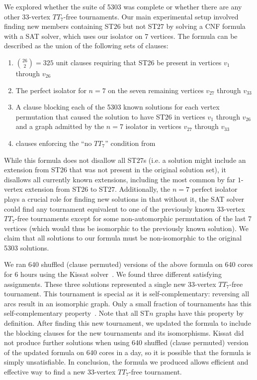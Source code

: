 \documentclass[conference]{IEEEtran}
\begin{document}
We explored whether the suite of 5303 was complete or whether there are any other 33-vertex $TT_7$-free tournaments.
 Our main experimental setup involved finding new members containing ST$26$ but not ST$27$ by solving a CNF formula with a SAT solver, which uses our isolator on 7 vertices. The formula can be described as the union of the following sets of clauses:
 
 \begin{enumerate}
 \item ${26 \choose 2} = 325$ unit clauses requiring that ST26 be present in vertices $v_1$ through $v_{26}$
 \item The perfect isolator for $n=7$ on the seven remaining vertices $v_{27}$ through $v_{33}$
 \item A clause blocking each of the 5303 known solutions for each vertex permutation that caused the solution to have ST$26$ in vertices $v_1$ through $v_{26}$ and a graph admitted by the $n=7$ isolator in vertices $v_{27}$ through $v_{33}$
 \item clauses enforcing the ``no $TT_7$'' condition from \cite{directedramsey}
 \end{enumerate}

While this formula does not disallow all ST$27$s (i.e. a solution might include an extension from ST$26$ that was not present in the original solution set), it disallows all currently known extensions, including the most common by far $1$-vertex extension from ST$26$ to ST$27$. Additionally, the $n=7$ perfect isolator plays a crucial role for finding new solutions in that without it, the SAT solver could find any tournament equivalent to one of the previously known 33-vertex $TT_7$-free tournaments  except for some non-automorphic permutation of the last 7 vertices (which would thus be isomorphic to the previously known solution). We claim that all solutions to our formula must be non-isomorphic to the original 5303 solutions. 

We ran 640 shuffled (clause permuted) versions of the above formula on 640 cores for 6 hours using the Kissat solver~\cite{Kissat}. We found three different satisfying assignments. These three solutions represented  a single new 33-vertex $TT_7$-free tournament. This tournament is special as it is self-complementary: reversing all arcs result in an isomorphic graph. Only a small fraction of tournaments has this self-complementary property~\cite{Eplett}. Note that all ST$n$ graphs have this property by definition. After finding this new tournament, we updated the formula to include the blocking clauses for the new tournaments and its isomorphisms. Kissat did not produce further solutions when using 640 shuffled (clause permuted) version of the updated formula on 640 cores in a day, so it is possible that the formula is simply unsatisfiable. In conclusion, the formula we produced allows efficient and effective way to find a new 33-vertex $TT_7$-free tournament. 
\end{document}
